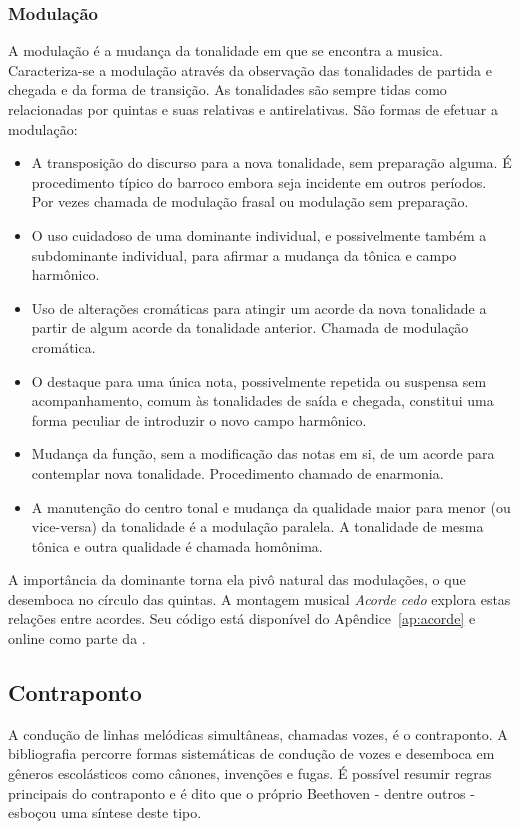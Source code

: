 \subsubsection{Modulação}
A modulação é a mudança da tonalidade em que se encontra a musica. Caracteriza-se a modulação através da observação
das tonalidades de partida e chegada e da forma de transição. As tonalidades são sempre tidas como relacionadas por quintas e suas relativas e antirelativas. São formas de efetuar a modulação:
\begin{itemize}
    \item A transposição do discurso para a nova tonalidade, sem preparação alguma. É procedimento típico do barroco embora seja incidente em outros períodos. Por vezes chamada de modulação frasal ou modulação sem preparação.
    \item O uso cuidadoso de uma dominante individual, e possivelmente também a subdominante individual, para afirmar a mudança da tônica e campo harmônico.
    \item Uso de alterações cromáticas para atingir um acorde da nova tonalidade a partir de algum acorde da tonalidade anterior. Chamada de modulação cromática.
    \item O destaque para uma única nota, possivelmente repetida ou suspensa sem acompanhamento, comum às tonalidades de saída e chegada, constitui uma forma peculiar de introduzir o novo campo harmônico.
    \item Mudança da função, sem a modificação das notas em si, de um acorde para contemplar nova tonalidade. Procedimento chamado de enarmonia.
    \item A manutenção do centro tonal e mudança da qualidade maior para menor (ou vice-versa) da tonalidade é a modulação paralela. A tonalidade de mesma tônica e outra qualidade é chamada homônima.
\end{itemize}

A importância da dominante torna ela pivô natural das modulações, o que desemboca no círculo das quintas.\cite{Harmonia,Salzer,Koellheuteur,Harmony} A montagem musical \emph{Acorde cedo} explora estas relações entre acordes. Seu código está disponível do Apêndice~\ref{ap:acorde} e online como parte da \massa.\cite{MASSA}


\subsection{Contraponto}\label{subsec:contraponto}

A condução de linhas melódicas simultâneas, chamadas vozes,
é o contraponto. A bibliografia
percorre formas sistemáticas de condução de vozes e desemboca em gêneros escolásticos como cânones, invenções e fugas. É possível resumir regras principais do contraponto e é dito que o próprio Beethoven - dentre outros - esboçou uma síntese deste tipo.

